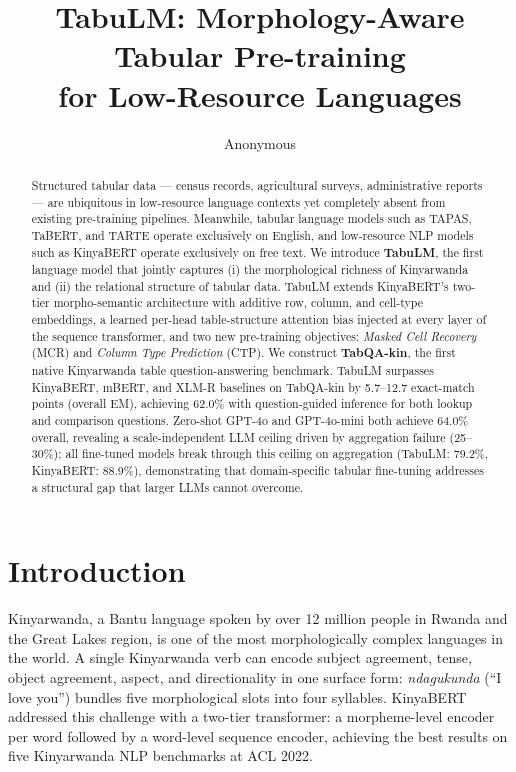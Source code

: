 \documentclass[11pt]{article}
\title{TabuLM: Morphology-Aware Tabular Pre-training\\for Low-Resource Languages}
\author{Anonymous}
\begin{document}
\maketitle

\begin{abstract}
Structured tabular data --- census records, agricultural surveys, administrative reports --- are ubiquitous in low-resource language contexts yet completely absent from existing pre-training pipelines.
Meanwhile, tabular language models such as TAPAS, TaBERT, and TARTE operate exclusively on English, and low-resource NLP models such as KinyaBERT operate exclusively on free text.
We introduce \textbf{TabuLM}, the first language model that jointly captures (i) the morphological richness of Kinyarwanda and (ii) the relational structure of tabular data.
TabuLM extends KinyaBERT's two-tier morpho-semantic architecture with additive row, column, and cell-type embeddings, a learned per-head table-structure attention bias injected at every layer of the sequence transformer, and two new pre-training objectives: \textit{Masked Cell Recovery} (MCR) and \textit{Column Type Prediction} (CTP).
We construct \textbf{TabQA-kin}, the first native Kinyarwanda table question-answering benchmark.
TabuLM surpasses KinyaBERT, mBERT, and XLM-R baselines on TabQA-kin by 5.7--12.7 exact-match points (overall EM), achieving 62.0\% with question-guided inference for both lookup and comparison questions.
Zero-shot GPT-4o and GPT-4o-mini both achieve 64.0\% overall, revealing a scale-independent LLM ceiling driven by aggregation failure (25--30\%); all fine-tuned models break through this ceiling on aggregation (TabuLM: 79.2\%, KinyaBERT: 88.9\%), demonstrating that domain-specific tabular fine-tuning addresses a structural gap that larger LLMs cannot overcome.
\end{abstract}

\section{Introduction}
\label{sec:intro}

Kinyarwanda, a Bantu language spoken by over 12 million people in Rwanda and the Great Lakes region, is one of the most morphologically complex languages in the world.
A single Kinyarwanda verb can encode subject agreement, tense, object agreement, aspect, and directionality in one surface form: \textit{ndagukunda} (``I love you'') bundles five morphological slots into four syllables.
KinyaBERT~\citep{nzeyimana-niyongabo-rubungo-2022-kinyabert} addressed this challenge with a two-tier transformer: a morpheme-level encoder per word followed by a word-level sequence encoder, achieving the best results on five Kinyarwanda NLP benchmarks at ACL 2022.
\end{document}
